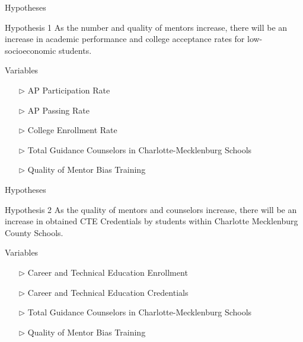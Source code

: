 \documentclass[10pt]{beamer}
\begin{document}
\begin{frame}[fragile]{Hypotheses}
    \fontsize{11pt}{7.2}
    \begin{block}{Hypothesis 1}
        As the number and quality of mentors increase, there will be an increase in academic performance and college acceptance rates for low-socioeconomic students.
    \end{block}

    \pause

    \vspace{.6cm}

    \begin{exampleblock}{Variables}
        \begin{itemize}
            \item[$\triangleright$] AP Participation Rate
            \item[$\triangleright$] AP Passing Rate
            \item[$\triangleright$] College Enrollment Rate 
            \item[$\triangleright$] Total Guidance Counselors in Charlotte-Mecklenburg Schools
            \item[$\triangleright$] Quality of Mentor Bias Training
        \end{itemize}
    \end{exampleblock}

\end{frame}

\begin{frame}[fragile]{Hypotheses}
    \fontsize{11pt}{7.2}
    \begin{block}{Hypothesis 2}
        As the quality of mentors and counselors increase, there will be an increase in obtained CTE  Credentials by students within Charlotte Mecklenburg County Schools.
    \end{block}

    \pause 

    \vspace{1cm}

    \begin{exampleblock}{Variables}
        \begin{itemize}
            \item[$\triangleright$] Career and Technical Education Enrollment
            \item[$\triangleright$] Career and Technical Education Credentials
            \item[$\triangleright$] Total Guidance Counselors in Charlotte-Mecklenburg Schools
            \item[$\triangleright$] Quality of Mentor Bias Training
        \end{itemize}
    \end{exampleblock}

\end{frame}
\end{document}
